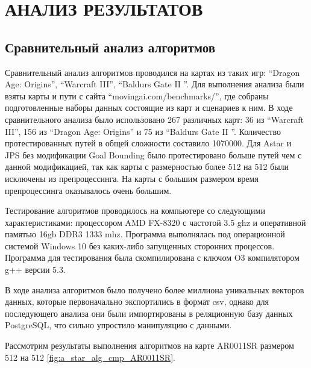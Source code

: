 \section[Анализ результатов]{\MakeTextUppercase{АНАЛИЗ РЕЗУЛЬТАТОВ}}

\subsection{Сравнительный анализ алгоритмов}

Сравнительный анализ алгоритмов проводился на картах из таких игр: ``Dragon Age: Origins'', ``Warcraft III'', ``Baldurs Gate II ''. Для выполнения анализа были взяты карты и пути с сайта ``movingai.com/benchmarks/'', где собраны подготовленные наборы данных состоящие из карт и сценариев к ним. В ходе сравнительного анализа было использовано 267 различных карт: 36 из ``Warcraft III'', 156 из ``Dragon Age: Origins'' и 75 из ``Baldurs Gate II ''. Количество протестированных путей в общей сложности составило 1070000. Для Astar и JPS без модификации Goal Bounding было протестировано больше путей чем с данной модификацией, так как карты с размерностью более 512 на 512 были исключены из препроцессинга. На карты с большим размером время препроцессинга оказывалось очень большим.

Тестирование алгоритмов проводилось на компьютере со следующими характеристиками: процессором AMD FX-8320 с частотой 3.5 ghz и оперативной памятью 16gb DDR3 1333 mhz. Программа выполнялась под операционной системой Windows 10 без каких-либо запущенных сторонних процессов. Программа для тестирования была скомпилирована с ключом O3 компилятором g++ версии 5.3.  

В ходе анализа алгоритмов было получено более миллиона уникальных векторов данных, которые первоначально экспортились в формат csv, однако для последующего анализа они были импортированы в реляционную базу данных PostgreSQL, что сильно упростило манипуляцию с данными.

Рассмотрим результаты выполнения алгоритмов на карте AR0011SR размером 512 на 512 \cref{fig:a_star_alg_cmp_AR0011SR}.

